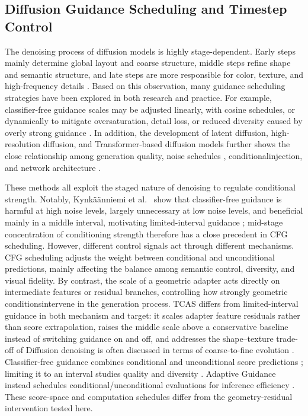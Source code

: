 \documentclass[times,twocolumn,final]{elsarticle}
\providecommand{\DIFadd}[1]{{\protect\color{blue} \sf #1}} %
\providecommand{\DIFdel}[1]{{\protect\color{red} \scriptsize #1}} %
\providecommand{\DIFaddbegin}{} %
\providecommand{\DIFdelbegin}{} %
\providecommand{\DIFdelend}{} %
\begin{document}
\subsection{Diffusion Guidance Scheduling and Timestep Control}
\label{subsec:guidance}

\DIFdelbegin \DIFdel{The denoising process of diffusion models is highly stage-dependent. Early steps mainly determine global layout and coarse structure, middle steps refine shape and semantic structure, and late steps are more responsible for color, texture, and high-frequency details \cite{ho2020ddpm,song2021ddim}. Based on this observation, many guidance scheduling strategies have been explored in both research and practice. For example, classifier-free guidance scales may be adjusted linearly, with cosine schedules, or dynamically to mitigate oversaturation, detail loss, or reduced diversity caused by overly strong guidance \cite{ho2022cfg,castillo2023adaptive}. In addition, the development of latent diffusion, high-resolution diffusion, and Transformer-based diffusion models further shows the close relationship among generation quality, noise schedules , conditionalinjection, and network architecture \cite{rombach2022ldm,esser2024scaling,blackforestlabs2024flux,loshchilov2019decoupled,cherti2023reproducible,nichol2022glide,saharia2022photorealistic,peebles2023scalable}. }%

\DIFdel{These methods all exploit the staged nature of denoising to regulate conditional strength.
Notably, Kynk\"a\"anniemi et al. \ show that classifier-free guidance is harmful at high noise levels, largely unnecessary at low noise levels, and beneficial mainly in a middle interval, motivating limited-interval guidance \cite{kynkanniemi2024limited}; mid-stage concentration of conditioning strength therefore has a close precedent in CFG scheduling. However, different control signals act through different mechanisms. CFG scheduling adjusts the weight between conditional and unconditional predictions, mainly affecting the balance among semantic control, diversity, and visual fidelity. By contrast, the scale of a geometric adapter acts directly on intermediate features or residual branches, controlling how strongly geometric conditionsintervene in the generation process. TCAS differs from limited-interval guidance in both mechanism and target: it scales adapter feature residuals rather than score extrapolation, raises the middle scale above a conservative baseline instead of switching guidance on and off, and addresses the shape--texture trade-off of }\DIFdelend \DIFaddbegin \DIFadd{Diffusion denoising is often discussed in terms of coarse-to-fine evolution \cite{ho2020ddpm,song2021ddim}. Classifier-free guidance combines conditional and unconditional score predictions \cite{ho2022cfg}; limiting it to an interval studies quality and diversity \cite{kynkanniemi2024limited}. Adaptive Guidance instead schedules conditional/unconditional evaluations for inference efficiency \cite{castillo2023adaptive}. These score-space and computation schedules differ from the geometry-residual intervention tested here.
}
\end{document}
